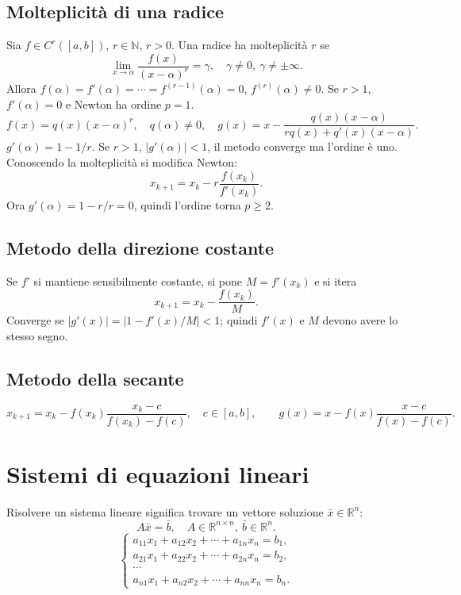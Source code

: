 \documentclass[11pt,a4paper]{article}
\newcommand{\R}{\mathbb R}\newcommand{\F}{\mathbb F}\newcommand{\tr}{\operatorname{tr}}\newcommand{\ar}{\operatorname{arr}}\newcommand{\fl}{\operatorname{fl}}
\newcommand{\pagina}[1]{\clearpage}
\begin{document}
\subsection*{Molteplicità di una radice}
Sia $f\in C^r([a,b])$, $r\in\mathbb N$, $r>0$. Una radice ha molteplicità $r$ se
\[\lim_{x\to\alpha}\frac{f(x)}{(x-\alpha)^r}=\gamma,\quad\gamma\ne0,\ \gamma\ne\pm\infty.\]
Allora $f(\alpha)=f'(\alpha)=\cdots=f^{(r-1)}(\alpha)=0$, $f^{(r)}(\alpha)\ne0$. Se $r>1$, $f'(\alpha)=0$ e Newton ha ordine $p=1$.
\[f(x)=q(x)(x-\alpha)^r,\quad q(\alpha)\ne0,\quad g(x)=x-\frac{q(x)(x-\alpha)}{rq(x)+q'(x)(x-\alpha)}.\]
\pagina{16}
$g'(\alpha)=1-1/r$. Se $r>1$, $|g'(\alpha)|<1$, il metodo converge ma l'ordine è uno. Conoscendo la molteplicità si modifica Newton:
\[x_{k+1}=x_k-r\frac{f(x_k)}{f'(x_k)}.\]
Ora $g'(\alpha)=1-r/r=0$, quindi l'ordine torna $p\ge2$.
\subsection*{Metodo della direzione costante}
Se $f'$ si mantiene sensibilmente costante, si pone $M=f'(x_k)$ e si itera
\[x_{k+1}=x_k-\frac{f(x_k)}M.\]
Converge se $|g'(x)|=|1-f'(x)/M|<1$; quindi $f'(x)$ e $M$ devono avere lo stesso segno.
\subsection*{Metodo della secante}
\[x_{k+1}=x_k-f(x_k)\frac{x_k-c}{f(x_k)-f(c)},\quad c\in[a,b],\qquad g(x)=x-f(x)\frac{x-c}{f(x)-f(c)}.\]
\pagina{17}\section{Sistemi di equazioni lineari}
Risolvere un sistema lineare significa trovare un vettore soluzione $\bar x\in\R^n$:
\[A\bar x=\bar b,\quad A\in\R^{n\times n},\ \bar b\in\R^n.\]
\[\begin{cases}a_{11}x_1+a_{12}x_2+\cdots+a_{1n}x_n=b_1,\\a_{21}x_1+a_{22}x_2+\cdots+a_{2n}x_n=b_2,\\\cdots\\a_{n1}x_1+a_{n2}x_2+\cdots+a_{nn}x_n=b_n.\end{cases}\]
\end{document}
